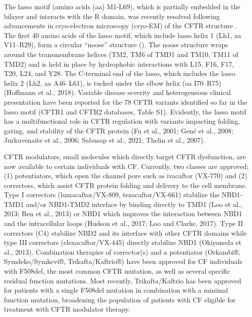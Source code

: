 The lasso motif (amino acids (aa) M1-L69), which is partially embedded in the bilayer and interacts with the R domain, was recently resolved following advancements in cryo-electron microscopy (cryo-EM) of the CFTR structure \cite{liu2017a, zhang2018a}. The first 40 amino acids of the lasso motif, which include lasso helix 1 (Lh1, aa V11–R29), form a circular “noose” structure (\cite{hoffman2018}). The noose structure wraps around the transmembrane helices (TM2, TM6 of TMD1 and TM10, TM11 of TMD2) and is held in place by hydrophobic interactions with L15, F16, F17, T20, L24, and Y28. The C-terminal end of the lasso, which includes the lasso helix 2 (Lh2, aa A46–L61), is tucked under the elbow helix (aa I70–R75) (Hoffmann et al., 2018). Variable disease severity and heterogeneous clinical presentation have been reported for the 78 CFTR variants identified so far in the lasso motif (CFTR1 and CFTR2 databases, Table S1). Evidently, the lasso motif has a multifunctional role in CFTR regulation with variants impacting folding, gating, and stability of the CFTR protein (Fu et al., 2001; Gené et al., 2008; Jurkuvenaite et al., 2006; Sabusap et al., 2021; Thelin et al., 2007).

CFTR modulators, small molecules which directly target CFTR dysfunction, are now available to certain individuals with CF. Currently, two classes are approved; (1) potentiators, which open the channel pore such as ivacaftor (VX-770) and (2) correctors, which assist CFTR protein folding and delivery to the cell membrane. Type I correctors (lumacaftor/VX-809, tezacaftor/VX-661) stabilize the NBD1-TMD1 and/or NBD1-TMD2 interface by binding directly to TMD1 (Loo et al., 2013; Ren et al., 2013) or NBD1 which improves the interaction between NBD1 and the intracellular loops (Hudson et al., 2017; Loo and Clarke, 2017). Type II correctors (C4) stabilize NBD2 and its interface with other CFTR domains while type III correctors (elexacaftor/VX-445) directly stabilize NBD1 (Okiyoneda et al., 2013). Combination therapies of corrector(s) and a potentiator (Orkambi®, Symdeko/Symkevi®, Trikafta/Kaftrio®) have been approved for CF individuals with F508del, the most common CFTR mutation, as well as several specific residual function mutations. Most recently, Trikafta/Kaftrio has been approved for patients with a single F508del mutation in combination with a minimal function mutation, broadening the population of patients with CF eligible for treatment with CFTR modulator therapy.


